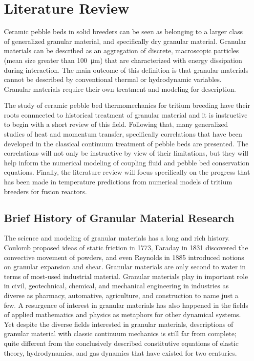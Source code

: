 \chapter{Literature Review}

Ceramic pebble beds in solid breeders can be seen as belonging to a larger class of generalized granular material, and specifically dry granular material. Granular materials can be described as an aggregation of discrete, macroscopic particles (mean size greater than \SI{100}{\micro\meter}) that are characterized with energy dissipation during interaction. \cite{duran2012sands} The main outcome of this definition is that granular materials cannot be described by conventional thermal or hydrodynamic variables. Granular materials require their own treatment and modeling for description.

The study of ceramic pebble bed thermomechanics for tritium breeding have their roots connnected to historical treatment of granular material and it is instructive to begin with a short review of this field. Following that, many generalized studies of heat and momentum transfer, specifically correlations that have been developed in the classical continuum treatment of pebble beds are presented. The correlations will not only be instructive by view of their limitations, but they will help inform the numerical modeling of coupling fluid and pebble bed conservation equations. Finally, the literature review will focus specifically on the progress that has been made in temperature predictions from numerical models of tritium breeders for fusion reactors.

\section{Brief History of Granular Material Research}
The science and modeling of granular materials has a long and rich history. Coulomb proposed ideas of static friction in 1773, Faraday in 1831 discovered the convective movement of powders, and even Reynolds in 1885 introduced notions on granular expansion and shear.\cite{Jaeger1996a} Granular materials are only second to water in terms of most-used industrial material. Granular materials play in important role in civil, geotechnical, chemical, and mechanical engineering in industries as diverse as pharmacy, automative, agriculture, and construction to name just a few.\cite{Hill,duran2012sands} A resurgence of interest in granular materials has also happened in the fields of applied mathematics and physics as metaphors for other dynamical systems.\cite{Jaeger1996a} Yet despite the diverse fields interested in granular materials, descriptions of granular material with classic continuum mechanics is still far from complete; quite different from the conclusively described constitutive equations of elastic theory, hydrodynamics, and gas dynamics that have existed for two centuries.\cite{Sadovskaya2012} 

